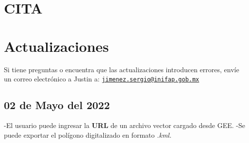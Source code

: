 \documentclass[
]{book}
\begin{document}
\hypertarget{cita}{%
\chapter{CITA}\label{cita}}

\hypertarget{actualizaciones}{%
\chapter{Actualizaciones}\label{actualizaciones}}

Si tiene preguntas o encuentra que las actualizaciones introducen errores, envíe un correo electrónico a Justin a: \href{mailto:jimenez.sergio@inifap.gob.mx}{\nolinkurl{jimenez.sergio@inifap.gob.mx}}

\hypertarget{de-mayo-del-2022}{%
\section{02 de Mayo del 2022}\label{de-mayo-del-2022}}

-El usuario puede ingresar la \textbf{URL} de un archivo vector cargado desde GEE.
-Se puede exportar el polígono digitalizado en formato \emph{.kml.}

  
\end{document}
